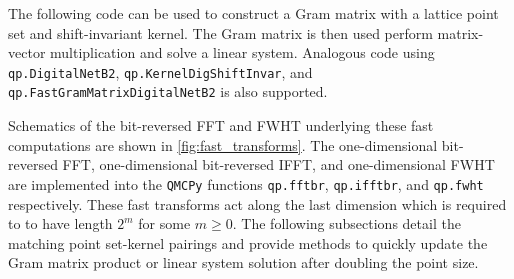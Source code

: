 \documentclass[acmsmall]{acmart}
\begin{document}
The following code can be used to construct a Gram matrix with a lattice point set and shift-invariant kernel. The Gram matrix is then used perform matrix-vector multiplication and solve a linear system. Analogous code using \texttt{qp.DigitalNetB2}, \texttt{qp.KernelDigShiftInvar}, and \texttt{qp.FastGramMatrixDigitalNetB2} is also supported. 



Schematics of the bit-reversed FFT and FWHT underlying these fast computations are shown in \cref{fig:fast_transforms}. The one-dimensional bit-reversed FFT, one-dimensional bit-reversed IFFT, and one-dimensional FWHT are implemented into the \texttt{QMCPy} functions \texttt{qp.fftbr}, \texttt{qp.ifftbr}, and \texttt{qp.fwht} respectively. These fast transforms act along the last dimension which is required to to have length $2^m$ for some $m \geq 0$.  The following subsections detail the matching point set-kernel pairings and provide methods to quickly update the Gram matrix product or linear system solution after doubling the point size.
\end{document}
